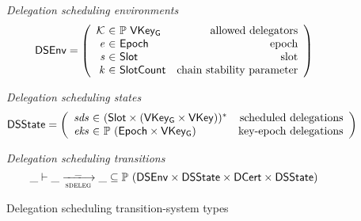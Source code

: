 \begin{figure}[htb]
  \emph{Delegation scheduling environments}
  \begin{equation*}
    \DSEnv =
    \left(
      \begin{array}{r@{~\in~}lr}
        \mathcal{K} & \powerset{\VKeyGen} & \text{allowed delegators}\\
        \var{e} & \Epoch & \text{epoch}\\
        \var{s} & \Slot & \text{slot}\\
        \var{k} & \SlotCount & \text{chain stability parameter}
      \end{array}
    \right)
  \end{equation*}

  \emph{Delegation scheduling states}
  \begin{equation*}
    \DSState
    = \left(
      \begin{array}{r@{~\in~}lr}
        \var{sds} & \seqof{(\Slot \times (\VKeyGen \times \VKey))} & \text{scheduled delegations}\\
        \var{eks} & \powerset{(\Epoch \times \VKeyGen)} & \text{key-epoch delegations}
      \end{array}
    \right)
  \end{equation*}

  \emph{Delegation scheduling transitions}
  \begin{equation*}
    \var{\_} \vdash
    \var{\_} \trans{sdeleg}{\_} \var{\_}
    \subseteq \powerset (\DSEnv \times \DSState \times \DCert \times \DSState)
  \end{equation*}
  \caption{Delegation scheduling transition-system types}
  \label{fig:ts-types:delegation-scheduling}
\end{figure}

